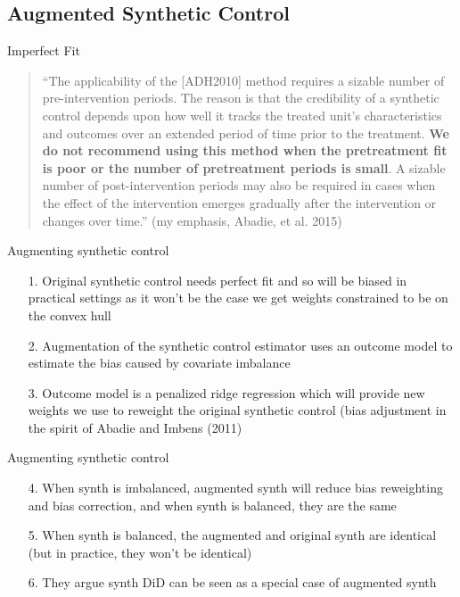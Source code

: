 \documentclass{beamer}
\begin{document}
\subsection{Augmented Synthetic Control}


\begin{frame}{Imperfect Fit}

\begin{quote}
``The applicability of the [ADH2010] method requires a sizable number of pre-intervention periods. The reason is that the credibility of a synthetic control depends upon how well it tracks the treated unit’s characteristics and outcomes over an extended period of time prior to the treatment. \textbf{We do not recommend using this method when the pretreatment fit is poor or the number of pretreatment periods is small}. A sizable number of post-intervention periods may also be required in cases when the effect of the intervention emerges gradually after the intervention or changes over time.'' (my emphasis, Abadie, et al. 2015)
\end{quote}

\end{frame}




\begin{frame}{Augmenting synthetic control}

\begin{enumerate}
\item[1. ] Original synthetic control needs perfect fit and so will be biased in practical settings as it won't be the case we get weights constrained to be  on the convex hull
\item[2. ] Augmentation of the synthetic control estimator uses an outcome model to estimate the bias caused by covariate imbalance 
\item[3. ] Outcome model is a penalized ridge regression which will provide new weights we use to reweight the original synthetic control (bias adjustment in the spirit of Abadie and Imbens (2011)
\end{enumerate}

\end{frame}


\begin{frame}{Augmenting synthetic control}

\begin{enumerate}
\item[4. ] When synth is imbalanced, augmented synth will reduce bias reweighting and bias correction, and when synth is balanced, they are the same
\item[5. ] When synth is balanced, the augmented and original synth are identical (but in practice, they won't be identical)
\item[6. ] They argue synth DiD can be seen as a special case of augmented synth
\end{enumerate}

\end{frame}
\end{document}
